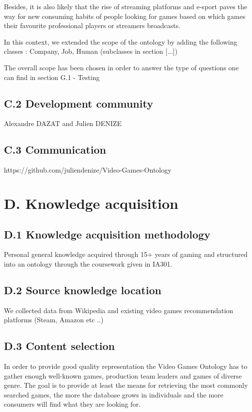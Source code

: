 \documentclass{article}
\begin{document}
Besides, it is also likely that the rise of streaming platforms and e-sport paves the way for new consuming habits of people looking for games based on which games their favourite professional players or streamers broadcasts.

In this context, we extended the scope of the ontology by adding the following classes : Company, Job, Human (subclasses  in section [...])

The overall scope has been chosen in order to answer the type of questions one can find in section G.1 - Testing



\subsection*{C.2 Development community}
Alexandre DAZAT and Julien DENIZE
\subsection*{C.3 Communication}

https://github.com/juliendenize/Video-Games-Ontology
\section*{D. Knowledge acquisition}

\subsection*{D.1 Knowledge acquisition methodology}

Personal general knowledge acquired through 15+ years of gaming and structured into an ontology through the coursework given in IA301. 
\subsection*{D.2 Source knowledge location}
We collected data from Wikipedia and existing video games recommendation platforms (Steam, Amazon etc ..) 
\subsection*{D.3 Content selection}


In order to provide good quality representation the Video Games Ontology has to gather enough well-known games, production team leaders and games of diverse genre. The goal is to provide at least the means for retrieving the most commonly searched games, the more the database grows in individuals and the more consumers will find what they are looking for. 
\end{document}

